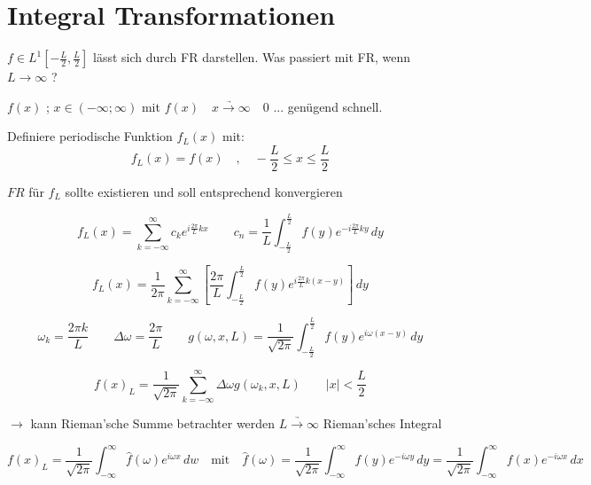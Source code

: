 \section{Integral Transformationen}

$f \in L^1[-\frac{L}{2}, \frac{L}{2}]$ lässt sich durch
FR darstellen. Was passiert mit FR, wenn 
$L \rightarrow \infty$ ?

$f(x)$ ; $x \in (-\infty; \infty)$ mit $f(x) \quad \underrightarrow{x \rightarrow \infty} \quad 0$
... genügend schnell.

Definiere periodische Funktion $f_L(x)$ mit:
$$f_L(x) = f(x) \quad , \quad -\frac{L}{2} \leq x \leq \frac{L}{2}$$

$FR$ für $f_L$ sollte existieren und soll entsprechend konvergieren

$$f_L(x) = \sum_{k = -\infty}^\infty c_k e^{i\frac{2 \pi}{L}kx} \qquad
    c_n = \frac{1}{L} \int_{- \frac{L}{2}}^{\frac{L}{2}} f(y) e^{-i\frac{2 \pi}{L}ky} \,dy$$

$$f_L(x) = \frac{1}{2\pi}  \sum_{k = -\infty}^\infty \left[ \frac{2\pi}{L} 
    \int_{- \frac{L}{2}}^{\frac{L}{2}} f(y) e^{i\frac{2 \pi}{L}k(x-y)} \right] \,dy$$

$$\omega_k = \frac{2 \pi k}{L} \qquad \Delta \omega = \frac{2\pi}{L} \qquad
    g(\omega, x, L) = \frac{1}{\sqrt{2\pi}} \int_{- \frac{L}{2}}^{\frac{L}{2}} f(y) 
    e^{i\omega (x-y)}\,dy$$

$$f(x)_L = \frac{1}{\sqrt{2\pi}} \sum_{k = -\infty}^\infty \Delta \omega g(\omega_k, x, L)
    \qquad \vert x \vert < \frac{L}{2}$$

$\rightarrow$ kann Rieman'sche Summe betrachter werden $\underrightarrow{L \rightarrow \infty}$ 
Rieman'sches Integral

$$f(x)_L = \frac{1}{\sqrt{2\pi}} \int_{-\infty}^\infty \hat{f}(\omega) e^{i \omega x} \,dw \quad
    \textrm{mit} \quad
    \hat{f}(\omega) = \frac{1}{\sqrt{2\pi}} \int_{-\infty}^\infty f(y) e^{-i \omega y} \,dy =
    \frac{1}{\sqrt{2\pi}} \int_{-\infty}^\infty f(x) e^{-i \omega x} \,dx $$





